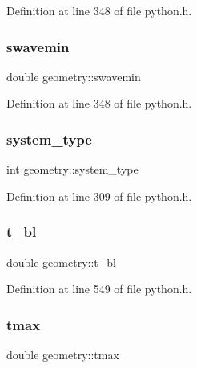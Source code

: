 Definition at line 348 of file python.\+h.

\mbox{\label{structgeometry_abc10c324e776f2bf8c809096402ecb75}} 
\subsubsection{\texorpdfstring{swavemin}{swavemin}}
{\footnotesize\ttfamily double geometry\+::swavemin}



Definition at line 348 of file python.\+h.

\mbox{\label{structgeometry_aa1d0031436952c2a2fdc2506c137b3d8}} 
\subsubsection{\texorpdfstring{system\+\_\+type}{system\_type}}
{\footnotesize\ttfamily int geometry\+::system\+\_\+type}



Definition at line 309 of file python.\+h.

\mbox{\label{structgeometry_a1f8e0859717e5e41ed53be2e222b9e2b}} 
\subsubsection{\texorpdfstring{t\+\_\+bl}{t\_bl}}
{\footnotesize\ttfamily double geometry\+::t\+\_\+bl}



Definition at line 549 of file python.\+h.

\mbox{\label{structgeometry_a54d0a2d5699ed4af1353429a7ec652bb}} 
\subsubsection{\texorpdfstring{tmax}{tmax}}
{\footnotesize\ttfamily double geometry\+::tmax}



